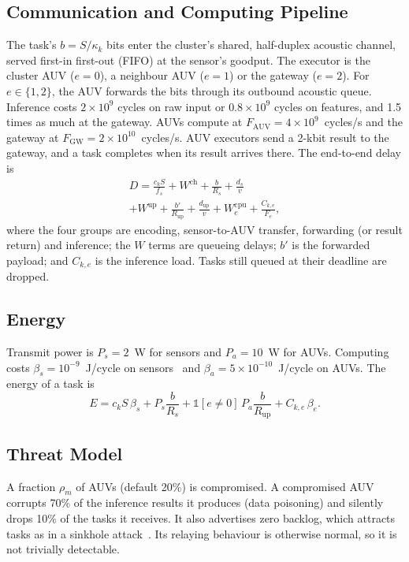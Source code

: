 \documentclass[lettersize,journal]{IEEEtran}
\begin{document}
\subsection{Communication and Computing Pipeline}
The task's $b=S/\kappa_k$ bits enter the cluster's shared, half-duplex acoustic channel, served first-in first-out (FIFO) at the sensor's goodput. The executor is the cluster AUV ($e=0$), a neighbour AUV ($e=1$) or the gateway ($e=2$). For $e\in\{1,2\}$, the AUV forwards the bits through its outbound acoustic queue. Inference costs $2\times10^9$ cycles on raw input or $0.8\times10^9$ cycles on features, and 1.5 times as much at the gateway. AUVs compute at $F_{\mathrm{AUV}}=4\times10^9$~cycles/s and the gateway at $F_{\mathrm{GW}}=2\times10^{10}$~cycles/s. AUV executors send a 2-kbit result to the gateway, and a task completes when its result arrives there. The end-to-end delay is
\begin{multline}
D = \frac{c_k S}{f_s} + W^{\mathrm{ch}} + \frac{b}{R_s} + \frac{d_s}{v} \\
+ W^{\mathrm{up}} + \frac{b'}{R_{\mathrm{up}}} + \frac{d_{\mathrm{up}}}{v} + W^{\mathrm{cpu}}_e + \frac{C_{k,e}}{F_e},
\end{multline}
where the four groups are encoding, sensor-to-AUV transfer, forwarding (or result return) and inference; the $W$ terms are queueing delays; $b'$ is the forwarded payload; and $C_{k,e}$ is the inference load. Tasks still queued at their deadline are dropped.

\subsection{Energy}
Transmit power is $P_s=2$~W for sensors and $P_a=10$~W for AUVs. Computing costs $\beta_s=10^{-9}$~J/cycle on sensors~\cite{shu2026offload} and $\beta_a=5\times10^{-10}$~J/cycle on AUVs. The energy of a task is
\begin{equation}
E = c_k S\,\beta_s + P_s \frac{b}{R_s} + \mathbb{1}[e\neq 0]\,P_a\frac{b}{R_{\mathrm{up}}} + C_{k,e}\,\beta_e .
\end{equation}

\subsection{Threat Model}
A fraction $\rho_m$ of AUVs (default 20\%) is compromised. A compromised AUV corrupts 70\% of the inference results it produces (data poisoning) and silently drops 10\% of the tasks it receives. It also advertises zero backlog, which attracts tasks as in a sinkhole attack~\cite{ahmad2026survey}. Its relaying behaviour is otherwise normal, so it is not trivially detectable.
\end{document}
